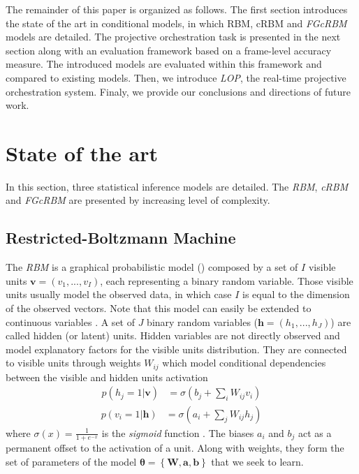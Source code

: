 \documentclass{amsart}
\begin{document}
	The remainder of this paper is organized as follows. The first section introduces the state of the art in conditional models, in which RBM, cRBM and \textit{FGcRBM} models are detailed. The projective orchestration task is presented in the next section along with an evaluation framework based on a frame-level accuracy measure. The introduced models are evaluated within this framework and compared to existing models. Then, we introduce \textit{LOP}, the real-time projective orchestration system. Finaly, we provide our conclusions and directions of future work.
	
	\section{State of the art}
	In this section, three statistical inference models are detailed. The \textit{RBM}, \textit{cRBM} and \textit{FGcRBM} are presented by increasing level of complexity.
	
	\subsection{Restricted-Boltzmann Machine}
	The \textit{RBM} \cite{hinton2006fast} is a graphical probabilistic model () composed by a set of $I$ visible units $\bm{v} = (v_{1},...,v_{I})$, each representing a binary random variable. Those visible units usually model the observed data, in which case $I$ is equal to the dimension of the observed vectors. Note that this model can easily be extended to continuous variables \cite{hinton2010practical}. A set of $J$ binary random variables ($\bm{h} = (h_{1},...,h_{J})$) are called hidden (or latent) units. Hidden variables are not directly observed and model explanatory factors for the visible units distribution. They are connected to visible units through weights $W_{ij}$ which model conditional dependencies between the visible and hidden units activation
	\begin{align}
	\label{eq:marginal_RBM_1}
	p(h_{j}=1|\bm{v}) &= \sigma \left( b_{j} + \sum_{i}W_{ij}v_{i} \right)
	\end{align}
	\begin{align}
	\label{eq:marginal_RBM_2}
	p(v_{i}=1|\bm{h}) &= \sigma \left( a_{i} + \sum_{j}W_{ij}h_{j} \right)
	\end{align}
	where $\sigma	(x) = \frac{1}{1+e^{-x}}$ is the \textit{sigmoid} function . The biases $a_{i}$ and $b_{j}$ act as a permanent offset to the activation of a unit. Along with weights, they form the set of parameters of the model $\bm{\theta} = \left\lbrace \bm{W} , \bm{a} , \bm{b} \right\rbrace$ that we seek to learn.
	
\end{document}
